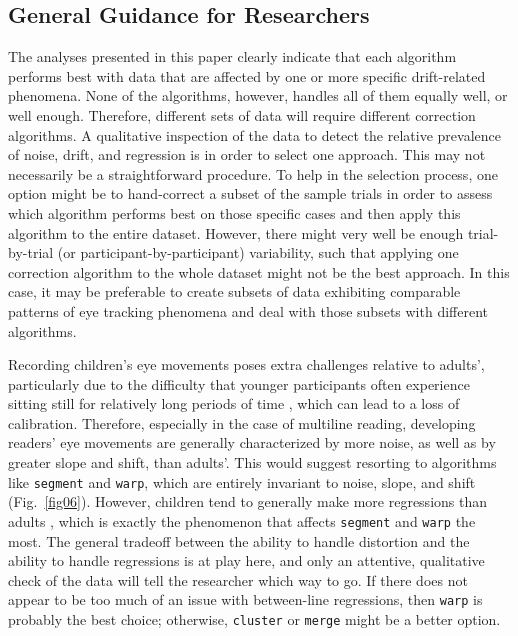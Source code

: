 \documentclass[doc,biblatex]{apa7}
\begin{document}
\subsection{General Guidance for Researchers}

The analyses presented in this paper clearly indicate that each algorithm performs best with data that are affected by one or more specific drift-related phenomena. None of the algorithms, however, handles all of them equally well, or well enough. Therefore, different sets of data will require different correction algorithms. A qualitative inspection of the data to detect the relative prevalence of noise, drift, and regression is in order to select one approach. This may not necessarily be a straightforward procedure. To help in the selection process, one option might be to hand-correct a subset of the sample trials in order to assess which algorithm performs best on those specific cases and then apply this algorithm to the entire dataset. However, there might very well be enough trial-by-trial (or participant-by-participant) variability, such that applying one correction algorithm to the whole dataset might not be the best approach. In this case, it may be preferable to create subsets of data exhibiting comparable patterns of eye tracking phenomena and deal with those subsets with different algorithms.

Recording children's eye movements poses extra challenges relative to adults', particularly due to the difficulty that younger participants often experience sitting still for relatively long periods of time \parencite{BlytheJoseph:2011}, which can lead to a loss of calibration. Therefore, especially in the case of multiline reading, developing readers' eye movements are generally characterized by more noise, as well as by greater slope and shift, than adults'. This would suggest resorting to algorithms like \texttt{segment} and \texttt{warp}, which are entirely invariant to noise, slope, and shift (Fig.~\ref{fig06}). However, children tend to generally make more regressions than adults \parencite[e.g.,][]{Reichle:2003, BlytheJoseph:2011}, which is exactly the phenomenon that affects \texttt{segment} and \texttt{warp} the most. The general tradeoff between the ability to handle distortion and the ability to handle regressions is at play here, and only an attentive, qualitative check of the data will tell the researcher which way to go. If there does not appear to be too much of an issue with between-line regressions, then \texttt{warp} is probably the best choice; otherwise, \texttt{cluster} or \texttt{merge} might be a better option.
\end{document}
